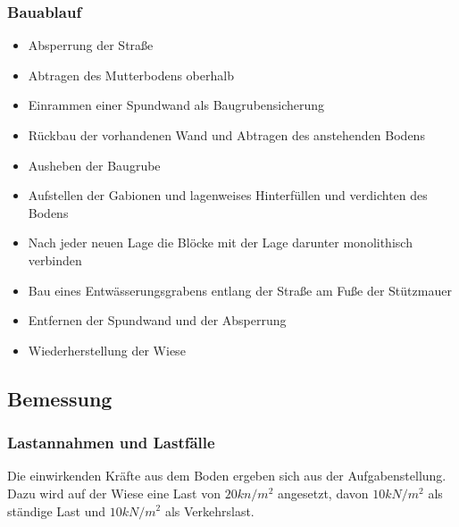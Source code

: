 \documentclass[11pt,fleqn,a4paper,halfparskip]{article}
\begin{document}
\subsubsection*{Bauablauf}
\begin{itemize}
\item Absperrung der Straße
\item Abtragen des Mutterbodens oberhalb
\item Einrammen einer Spundwand als Baugrubensicherung
\item Rückbau der vorhandenen Wand und Abtragen des anstehenden Bodens
\item Ausheben der Baugrube 
\item Aufstellen der Gabionen und lagenweises Hinterfüllen und verdichten des Bodens
\item Nach jeder neuen Lage die Blöcke mit der Lage darunter monolithisch verbinden
\item Bau eines Entwässerungsgrabens entlang der Straße am Fuße der Stützmauer
\item Entfernen der Spundwand und der Absperrung
\item Wiederherstellung der Wiese
\end{itemize}
\subsection{Bemessung}
\subsubsection{Lastannahmen und Lastfälle}
Die einwirkenden Kräfte aus dem Boden ergeben sich aus der Aufgabenstellung. Dazu wird auf der Wiese eine Last von $20kn/m^2$ angesetzt, davon $10kN/m^2$ als ständige Last und $10kN/m^2$ als Verkehrslast.
\end{document}
